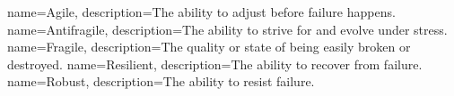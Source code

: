 \makeglossary

{
	name=Agile,
	description={The ability to adjust before failure happens.}
}
{
	name=Antifragile,
	description={The ability to strive for and evolve under stress.}
}
{
	name=Fragile,
	description={The quality or state of being easily broken or destroyed.}
}
{
	name=Resilient,
	description={The ability to recover from failure.}
}
{
	name=Robust,
	description={The ability to resist failure.}
}